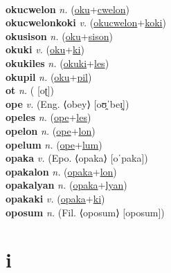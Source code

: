  \label{okumihutatuniluhilasomales} \\
\textbf{okucwelon} \textit{n.} (\hyperref[oku]{oku}+\hyperref[cwelon]{cwelon})
 \label{okucwelon} \\
\textbf{okucwelonkoki} \textit{v.} (\hyperref[okucwelon]{okucwelon}+\hyperref[koki]{koki})
 \label{okucwelonkoki} \\
\textbf{okusison} \textit{n.} (\hyperref[oku]{oku}+\hyperref[sison]{sison})
 \label{okusison} \\
\textbf{okuki} \textit{v.} (\hyperref[oku]{oku}+\hyperref[ki]{ki})
 \label{okuki} \\
\textbf{okukiles} \textit{n.} (\hyperref[okuki]{okuki}+\hyperref[les]{les})
 \label{okukiles} \\
\textbf{okupil} \textit{n.} (\hyperref[oku]{oku}+\hyperref[pil]{pil})
 \label{okupil} \\
\textbf{ot} \textit{n.} ( [oʈ])
 \label{ot} \\
\textbf{ope} \textit{v.} (Eng. ⟨obey⟩ [oʊ̯ˈbeɪ̯])
 \label{ope} \\
\textbf{opeles} \textit{n.} (\hyperref[ope]{ope}+\hyperref[les]{les})
 \label{opeles} \\
\textbf{opelon} \textit{n.} (\hyperref[ope]{ope}+\hyperref[lon]{lon})
 \label{opelon} \\
\textbf{opelum} \textit{n.} (\hyperref[ope]{ope}+\hyperref[lum]{lum})
 \label{opelum} \\
\textbf{opaka} \textit{v.} (Epo. ⟨opaka⟩ [oˈpaka])
 \label{opaka} \\
\textbf{opakalon} \textit{n.} (\hyperref[opaka]{opaka}+\hyperref[lon]{lon})
 \label{opakalon} \\
\textbf{opakalyan} \textit{n.} (\hyperref[opaka]{opaka}+\hyperref[lyan]{lyan})
 \label{opakalyan} \\
\textbf{opakaki} \textit{v.} (\hyperref[opaka]{opaka}+\hyperref[ki]{ki})
 \label{opakaki} \\
\textbf{oposum} \textit{n.} (Fil. ⟨oposum⟩ [oposum])
 \label{oposum} 

\section{i}

